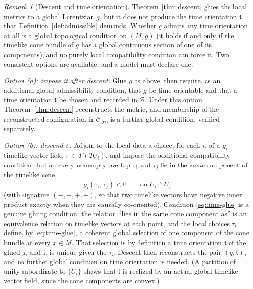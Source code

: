 \documentclass[11pt,a4paper]{article}
\theoremstyle{plain}
\theoremstyle{definition}
\theoremstyle{remark}
\newtheorem{remark}[theorem]{Remark}
\newcommand{\Cgeo}{\mathcal{C}_{\mathrm{geo}}}
\begin{document}
\begin{remark}[Descent and time orientation]
\label{rem:descent-time}
Theorem~\ref{thm:descent} glues the local metrics to a global Lorentzian $g$, but it does not
produce the time orientation $\mathfrak{t}$ that Definition~\ref{def:admissible} demands. Whether
$g$ admits any time orientation at all is a global topological condition on
$(M,g)$ (it holds if and only if the timelike cone bundle of $g$ has a global continuous section
of one of its components), and no purely local compatibility condition can force it. Two
consistent options are available, and a model must declare one.

\emph{Option (a): impose it after descent.} Glue $g$ as above, then require, as an additional
global admissibility condition, that $g$ be time-orientable and that a time orientation
$\mathfrak{t}$ be chosen and recorded in $\mathcal{B}$. Under this option
Theorem~\ref{thm:descent} reconstructs the metric, and membership of the reconstructed
configuration in $\Cgeo$ is a further global condition, verified separately.

\emph{Option (b): descend it.} Adjoin to the local data a choice, for each $i$, of a
$g_i$-timelike vector field $\tau_i\in\Gamma(TU_i)$, and impose the additional compatibility
condition that on every nonempty overlap $\tau_i$ and $\tau_j$ lie in the \emph{same} component
of the timelike cone,
\begin{equation}
\label{eq:time-glue}
g_i(\tau_i,\tau_j)<0 \qquad\text{on } U_i\cap U_j
\end{equation}
(with signature $(-,+,+,+)$, so that two timelike vectors have negative inner product exactly when
they are causally co-oriented). Condition \eqref{eq:time-glue} is a genuine gluing condition: the
relation ``lies in the same cone component as'' is an equivalence relation on timelike vectors at
each point, and the local choices $\tau_i$ define, by \eqref{eq:time-glue}, a coherent global
selection of one component of the cone bundle at every $x\in M$. That selection is by definition a
time orientation $\mathfrak{t}$ of the glued $g$, and it is unique given the $\tau_i$. Descent then
reconstructs the pair $(g,\mathfrak{t})$, and no further global condition on time orientation is
needed. (A partition of unity subordinate to $\{U_i\}$ shows that $\mathfrak{t}$ is realized by an
actual global timelike vector field, since the cone components are convex.)
\end{remark}
\end{document}

